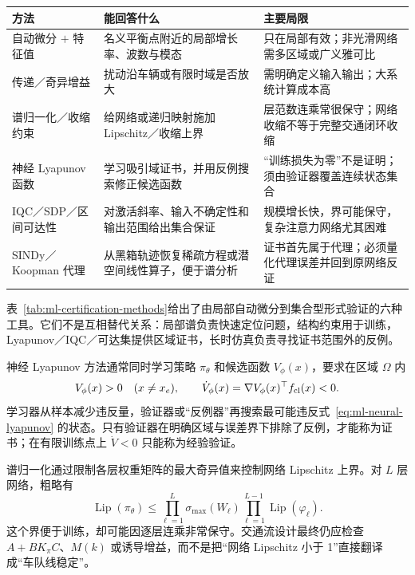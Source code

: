 \documentclass[11pt,a4paper,openany]{book}
\numberwithin{equation}{chapter}
\numberwithin{figure}{chapter}
\numberwithin{table}{chapter}
\newcommand{\tabletext}[2]{%
  \par\smallskip\noindent
  表~\ref{#1}给出了#2
  \par\smallskip
}
\begin{document}
\begin{center}
\small
{}
\label{tab:ml-certification-methods}
\begin{tabular}{p{3.0cm}p{5.0cm}p{6.1cm}}
\toprule
\textbf{方法} & \textbf{能回答什么} & \textbf{主要局限} \\
\midrule
自动微分 $+$ 特征值 & 名义平衡点附近的局部增长率、波数与模态 & 只在局部有效；非光滑网络需多区域或广义雅可比 \\
传递／奇异增益 & 扰动沿车辆或有限时域是否放大 & 需明确定义输入输出；大系统计算成本高 \\
谱归一化／收缩约束 & 给网络或递归映射施加 Lipschitz／收缩上界 & 层范数连乘常很保守；网络收缩不等于完整交通闭环收缩 \\
神经 Lyapunov 函数 & 学习吸引域证书，并用反例搜索修正候选函数 & “训练损失为零”不是证明；须由验证器覆盖连续状态集合 \\
IQC／SDP／区间可达性 & 对激活斜率、输入不确定性和输出范围给出集合保证 & 规模增长快，界可能保守，复杂注意力网络尤其困难 \\
SINDy／Koopman 代理 & 从黑箱轨迹恢复稀疏方程或潜空间线性算子，便于谱分析 & 证书首先属于代理；必须量化代理误差并回到原网络反证 \\
\bottomrule
\end{tabular}
\end{center}
\tabletext{tab:ml-certification-methods}{由局部自动微分到集合型形式验证的六种工具。它们不是互相替代关系：局部谱负责快速定位问题，结构约束用于训练，Lyapunov／IQC／可达集提供区域证书，长时仿真负责寻找证书范围外的反例。}

神经 Lyapunov 方法通常同时学习策略 $\pi_\theta$ 和候选函数 $V_\phi(x)$，要求在区域 $\Omega$ 内
\begin{equation}
V_\phi(x)>0\quad(x\ne x_e),\qquad
\dot V_\phi(x)=\nabla V_\phi(x)^\top f_{\rm cl}(x)<0.
\label{eq:ml-neural-lyapunov}
\end{equation}
学习器从样本减少违反量，验证器或“反例器”再搜索最可能违反式~\eqref{eq:ml-neural-lyapunov} 的状态。只有验证器在明确区域与误差界下排除了反例，才能称为证书；在有限训练点上 $\dot V<0$ 只能称为经验验证。

谱归一化通过限制各层权重矩阵的最大奇异值来控制网络 Lipschitz 上界。对 $L$ 层网络，粗略有
\begin{equation}
\operatorname{Lip}(\pi_\theta)
\le \prod_{\ell=1}^{L}\sigma_{\max}(W_\ell)
\prod_{\ell=1}^{L-1}\operatorname{Lip}(\varphi_\ell).
\label{eq:ml-lipschitz-product}
\end{equation}
这个界便于训练，却可能因逐层连乘非常保守。交通流设计最终仍应检查 $A+BK_\pi C$、$M(k)$ 或诱导增益，而不是把“网络 Lipschitz 小于 1”直接翻译成“车队线稳定”。
\end{document}
